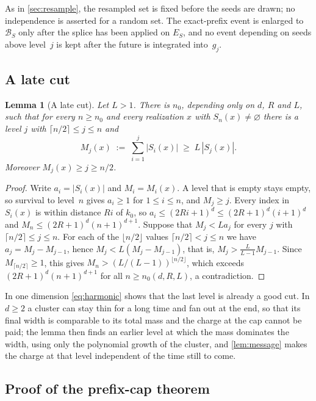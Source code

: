 \documentclass[11pt]{article}
\theoremstyle{plain}
\newtheorem{lemma}[theorem]{Lemma}
\theoremstyle{definition}
\theoremstyle{remark}
\begin{document}
As in \cref{sec:resample}, the resampled set is fixed before the seeds are drawn; no independence is asserted for a random set. The exact-prefix event is enlarged to $\mathcal B_S$ only after the splice has been applied on $E_S$, and no event depending on seeds above level~$j$ is kept after the future is integrated into~$g_j$.

\subsection{A late cut}

\begin{lemma}[A late cut]
\label{lem:latecut}
Let $L>1$. There is $n_0$, depending only on $d$, $R$ and $L$, such that for every $n\ge n_0$ and every realization $x$ with $S_n(x)\neq\varnothing$ there is a level $j$ with $\lceil n/2\rceil\le j\le n$ and
\[
M_j(x)\;:=\;\sum_{i=1}^j|S_i(x)|\;\ge\;L\,|S_j(x)|.
\]
Moreover $M_j(x)\ge j\ge n/2$.
\end{lemma}

\begin{proof}
Write $a_i=|S_i(x)|$ and $M_i=M_i(x)$. A level that is empty stays empty, so survival to level~$n$ gives $a_i\ge1$ for $1\le i\le n$, and $M_j\ge j$. Every index in $S_i(x)$ is within distance $Ri$ of $k_0$, so $a_i\le(2Ri+1)^d\le(2R+1)^d(i+1)^d$ and $M_n\le(2R+1)^d(n+1)^{d+1}$. Suppose that $M_j<La_j$ for every $j$ with $\lceil n/2\rceil\le j\le n$. For each of the $\lfloor n/2\rfloor$ values $\lceil n/2\rceil<j\le n$ we have $a_j=M_j-M_{j-1}$, hence $M_j<L(M_j-M_{j-1})$, that is, $M_j>\frac{L}{L-1}M_{j-1}$. Since $M_{\lceil n/2\rceil}\ge1$, this gives $M_n>(L/(L-1))^{\lfloor n/2\rfloor}$, which exceeds $(2R+1)^d(n+1)^{d+1}$ for all $n\ge n_0(d,R,L)$, a contradiction.
\end{proof}

In one dimension \eqref{eq:harmonic} shows that the last level is already a good cut. In $d\ge2$ a cluster can stay thin for a long time and fan out at the end, so that its final width is comparable to its total mass and the charge at the cap cannot be paid; the lemma then finds an earlier level at which the mass dominates the width, using only the polynomial growth of the cluster, and \cref{lem:message} makes the charge at that level independent of the time still to come.

\subsection{Proof of the prefix-cap theorem}
\end{document}
